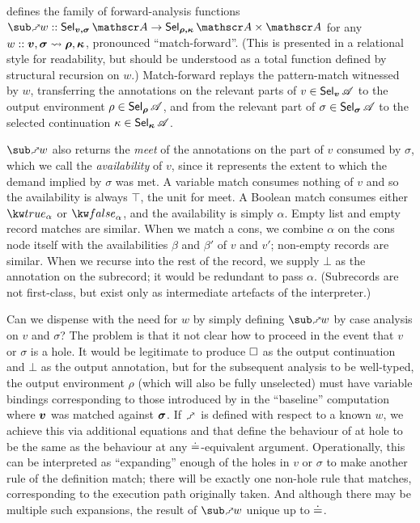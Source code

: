  defines the family of forward-analysis functions $\matchFwdF{w} :: \Sel{v, \sigma}{A} \to \Prod{\Sel{\rho, \kappa}{A}}{\Ann{A}}$ for any $w :: \bm{v}, \bm{\sigma} \rightsquigarrow \bm{\rho}, \bm{\kappa}$, pronounced ``match-forward''. (This is presented in a relational style for readability, but should be understood as a total function defined by structural recursion on $w$.) Match-forward replays the pattern-match witnessed by $w$, transferring the annotations on the relevant parts of $v \in \textup{\textsf{Sel}}_{\bm{v}}\,{\mathscr{A}}$ to the output environment $\rho \in \textup{\textsf{Sel}}_{\bm{\rho}}\,{\mathscr{A}}$, and from the relevant part of $\sigma \in \textup{\textsf{Sel}}_{\bm{\sigma}}\,{\mathscr{A}}$ to the selected continuation $\kappa \in \textup{\textsf{Sel}}_{\bm{\kappa}}\,{\mathscr{A}}$.

$\matchFwdF{w}$ also returns the \emph{meet} of the annotations on the part of $v$ consumed by $\sigma$, which we call the \emph{availability} of $v$, since it represents the extent to which the demand implied by $\sigma$ was met. A variable match consumes nothing of $v$ and so the availability is always $\top$, the unit for meet. A Boolean match consumes either $\annot{\exTrue}{\alpha}$ or $\annot{\exFalse}{\alpha}$, and the availability is simply $\alpha$. Empty list and empty record matches are similar. When we match a cons, we combine $\alpha$ on the cons node itself with the availabilities $\beta$ and $\beta'$ of $v$ and $v'$; non-empty records are similar. When we recurse into the rest of the record, we supply $\bot$ as the annotation on the subrecord; it would be redundant to pass $\alpha$. (Subrecords are not first-class, but exist only as intermediate artefacts of the interpreter.)

Can we dispense with the need for $w$ by simply defining $\matchFwdF{w}$ by case analysis on $v$ and $\sigma$? The problem is that it not clear how to proceed in the event that $v$ or $\sigma$ is a hole. It would be legitimate to produce $\square$ as the output continuation and $\bot$ as the output annotation, but for the subsequent analysis to be well-typed, the output environment $\rho$ (which will also be fully unselected) must have variable bindings corresponding to those introduced by in the ``baseline'' computation where $\bm{v}$ was matched against $\bm{\sigma}$. If $\matchFwdS$ is defined with respect to a known $w$, we achieve this via additional equations  and  that define the behaviour of at hole to be the same as the behaviour at any $\doteq$-equivalent argument. Operationally, this can be interpreted as ``expanding'' enough of the holes in $v$ or $\sigma$ to make another rule of the definition match; there will be exactly one non-hole rule that matches, corresponding to the execution path originally taken. And although there may be multiple such expansions, the result of $\matchFwdF{w}$ unique up to $\doteq$.

